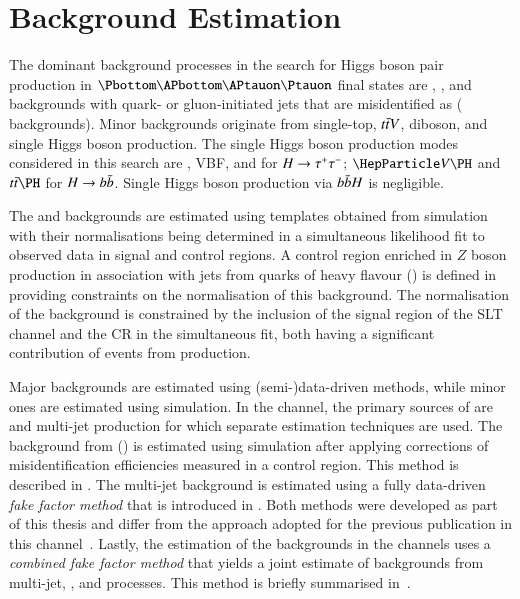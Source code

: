 \section{Background Estimation}%
\label{sec:background_estimation}

The dominant background processes in the search for Higgs boson pair production
in $\bbtautau$ final states are \Zjets, \ttbar, and backgrounds with quark- or
gluon-initiated jets that are misidentified as \tauhadvis (\faketauhadvis
backgrounds).
Minor backgrounds originate from single-top, $t\bar{t} V$, diboson, and single
Higgs boson production.  The single Higgs boson production modes considered in
this search are \ggF, VBF, \VH and \ttH for $H \to \tau^{+} \tau^{-}$; $\VH$ and $\ttH$
for $H \to b\bar{b}$. Single Higgs boson production via $b\bar{b} H$ is negligible.

The \Zjets and \ttbar backgrounds are estimated using templates obtained from
simulation with their normalisations being determined in a simultaneous
likelihood fit to observed data in signal and control regions. A control region
enriched in $Z$ boson production in association with jets from quarks of heavy
flavour (\ZHF) is defined in  providing constraints on the
normalisation of this background. The normalisation of the \ttbar background is
constrained by the inclusion of the signal region of the \lephad SLT channel and
the \ZHF CR in the simultaneous fit, both having a significant contribution of
events from \ttbar production.

Major \faketauhadvis backgrounds are estimated using (semi-)data-driven methods,
while minor ones are estimated using simulation. In the \hadhad channel, the
primary sources of \faketauhadvis are \ttbar and multi-jet production for which
separate estimation techniques are used. The \faketauhadvis background from
\ttbar (\ttbarFakes) is estimated using simulation after applying corrections of
\jettotauhadvis misidentification efficiencies measured in a control
region. This method is described in . The
multi-jet background is estimated using a fully data-driven \emph{fake factor
  method} that is introduced in . Both methods were
developed as part of this thesis and differ from the approach adopted for the
previous publication in this channel~\cite{HIGG-2016-16-witherratum}. Lastly,
the estimation of the \faketauhadvis backgrounds in the \lephad channels uses a
\emph{combined fake factor method} that yields a joint estimate of
\faketauhadvis backgrounds from multi-jet, \Wjets, and \ttbar processes. This
method is briefly summarised in~.

